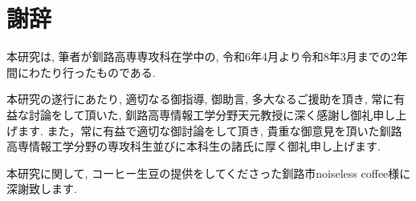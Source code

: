 \chapter*{謝辞}
\pagestyle{empty}

本研究は, 筆者が釧路高専専攻科在学中の, 令和6年4月より令和8年3月までの2年間にわたり行ったものである.

本研究の遂行にあたり, 適切なる御指導, 御助言, 多大なるご援助を頂き, 常に有益な討論をして頂いた, 釧路高専情報工学分野天元教授に深く感謝し御礼申し上げます. 
また，常に有益で適切な御討論をして頂き, 貴重な御意見を頂いた釧路高専情報工学分野の専攻科生並びに本科生の諸氏に厚く御礼申し上げます.

本研究に関して, コーヒー生豆の提供をしてくださった釧路市noiseless coffee様に深謝致します.
